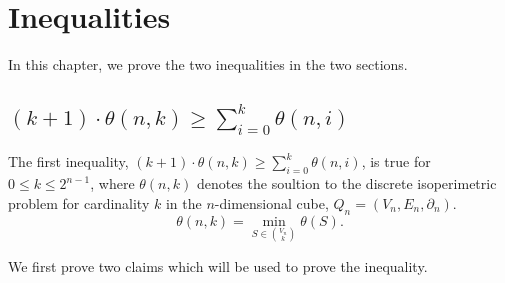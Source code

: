 \documentclass[12pt]{ucthesis}
\theoremstyle{plain}
\theoremstyle{definition}
\begin{document}
\chapter{Inequalities}
\label{Chapter 4}

In this chapter, we prove the two inequalities in the two sections.

\section{$(k + 1) \cdot \theta(n, k) \ge \sum_{i = 0}^k \theta(n, i)$}
\label{Section 4.1}

The first inequality, $(k + 1) \cdot \theta(n, k) \ge \sum_{i = 0}^k \theta(n, i)$,
is true for $0 \le k \le 2^{n - 1}$,
where $\theta(n, k)$ denotes the soultion to the discrete isoperimetric problem
for cardinality $k$ in the $n$-dimensional cube, $Q_n = (V_n, E_n, \partial_n)$.
\begin{equation*}
\theta(n, k) = \min_{S \in \binom{V_n}{k}} \theta(S).
\end{equation*}

We first prove two claims which will be used to prove the inequality.
\end{document}
